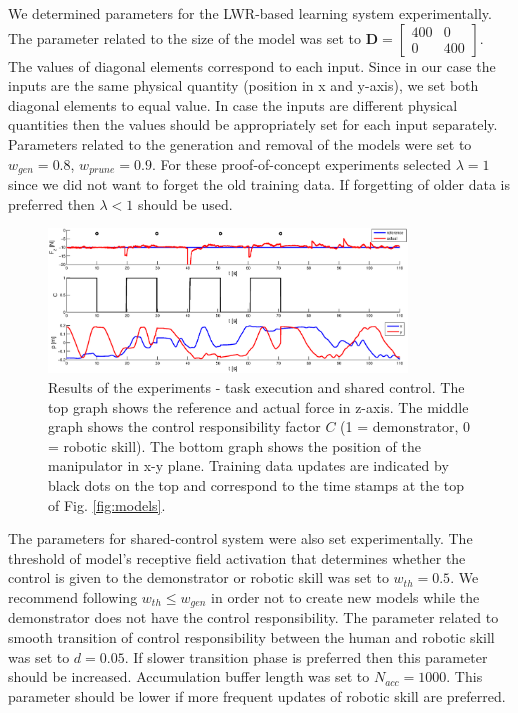 We determined parameters for the LWR-based learning system experimentally. The parameter related to the size of the model was set to $\bm{D} = \begin{bmatrix} 400 & 0 \\[0.3em] 0 & 400\end{bmatrix}$. The values of diagonal elements correspond to each input. Since in our case the inputs are the same physical quantity (position in x and y-axis), we set both diagonal elements to equal value. In case the inputs are different physical quantities then the values should be appropriately set for each input separately. Parameters related to the generation and removal of the models were set to $w_{gen}=0.8$, $w_{prune}=0.9$. For these proof-of-concept experiments selected $\lambda=1$ since we did not want to forget the old training data. If forgetting of older data is preferred then $\lambda < 1$ should be used.
\begin{figure}[!ht]
  \centering
  \includegraphics[width=0.85\textwidth]{Luka/results2.eps}
  \caption{Results of the experiments - task execution and shared control. The top graph shows the reference and actual force in z-axis. The middle graph shows the control responsibility factor $C$ (1 = demonstrator, 0 = robotic skill). The bottom graph shows the position of the manipulator in x-y plane. Training data updates are indicated by black dots on the top and correspond to the time stamps at the top of Fig. \ref{fig:models}.}
  \label{fig:force}
  \vspace{-4 mm}
\end{figure}

The parameters for shared-control system were also set experimentally. The threshold of model's receptive field activation that determines whether the control is given to the demonstrator or robotic skill was set to $w_{th}=0.5$. We recommend following $w_{th}\leq w_{gen}$ in order not to create new models while the demonstrator does not have the control responsibility. The parameter related to smooth transition of control responsibility between the human and robotic skill was set to $d=0.05$. If slower transition phase is preferred then this parameter should be increased. Accumulation buffer length was set to $N_{acc}=1000$. This parameter should be lower if more frequent updates of robotic skill are preferred.

